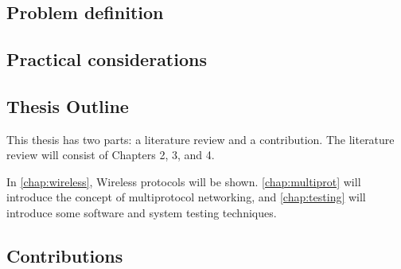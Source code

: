 \chapter{\bevezetes}



\section{Problem definition}

%


\section{Practical considerations}

\section{Thesis Outline}

This thesis has two parts: a literature review and a contribution. The literature review will consist of Chapters 2, 3, and 4.

In \autoref{chap:wireless}, Wireless protocols will be shown.
\autoref{chap:multiprot} will introduce the concept of multiprotocol networking, and \autoref{chap:testing} will introduce some software and system testing techniques.


\section{Contributions}
